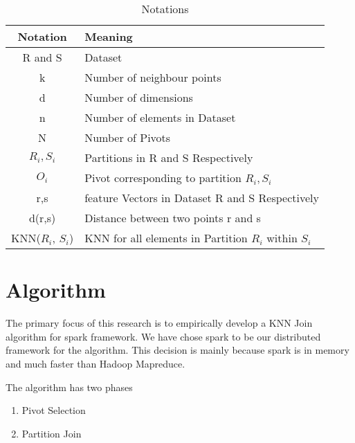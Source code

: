 \documentclass[12pt]{article}
\begin{document}
\begin{table}[!t]
  \caption{Notations}
  \label{notations}
  \centering
  \begin{tabular}{|c|l|}
    \hline
    Notation & Meaning \\
    \hline
    R and S & Dataset\\

    k & Number of neighbour points \\

    d & Number of dimensions \\

    n & Number of elements in Dataset \\

    N & Number of Pivots \\

    $R_i, S_i$ & Partitions in R and S Respectively \\

    $O_i$ & Pivot corresponding to partition $R_i, S_i$ \\

    r,s & feature Vectors in Dataset R and S Respectively \\

    d(r,s) & Distance between two points r and s \\

    KNN($R_i$, $S_i$) & KNN for all elements in Partition $R_i$ within
                        $S_i$ \\
    \hline
  \end{tabular}
\end{table}


\bigskip

\section{Algorithm}
The primary focus of this research is to empirically develop a KNN
Join algorithm for spark framework. We have chose spark to be our
distributed framework for the algorithm. This decision is mainly
because spark is in memory and much faster than Hadoop Mapreduce.

\bigskip

The algorithm has two phases
\begin{enumerate}
\item Pivot Selection
\item Partition Join
\end{enumerate}
\end{document}
